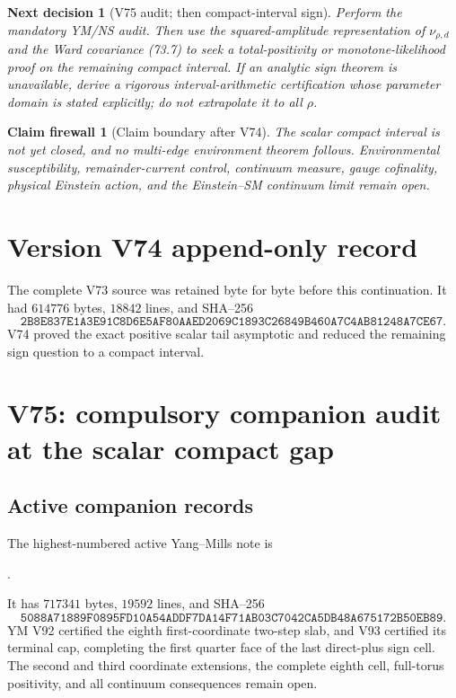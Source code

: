 \documentclass[11pt]{article}
\newtheorem{firewall}[theorem]{Claim firewall}
\newtheorem{decision}[theorem]{Next decision}
\theoremstyle{remark}
\begin{document}
\begin{decision}[V75 audit; then compact-interval sign]
\label{dec:v17v74-next}
Perform the mandatory YM/NS audit.  Then use the squared-amplitude
representation of \(\nu_{\rho,d}\) and the Ward covariance (73.7) to
seek a total-positivity or monotone-likelihood proof on the remaining
compact interval.  If an analytic sign theorem is unavailable, derive
a rigorous interval-arithmetic certification whose parameter domain
is stated explicitly; do not extrapolate it to all \(\rho\).
\end{decision}

\begin{firewall}[Claim boundary after V74]
\label{fire:v17v74}
The scalar compact interval is not yet closed, and no multi-edge
environment theorem follows.  Environmental susceptibility,
remainder-current control, continuum measure, gauge cofinality,
physical Einstein action, and the Einstein--SM continuum limit remain
open.
\end{firewall}

\section*{Version V74 append-only record}
The complete V73 source was retained byte for byte before this
continuation.  It had \(614776\) bytes, \(18842\) lines, and SHA--256
\[
 \texttt{2B8E837E1A3E91C8D6E5AF80AAED2069C1893C26849B460A7C4AB81248A7CE67}.
\]
V74 proved the exact positive scalar tail asymptotic and reduced the
remaining sign question to a compact interval.


\section{V75: compulsory companion audit at the scalar compact gap}
\label{sec:v17v75}

\subsection{Active companion records}

The highest-numbered active Yang--Mills note is
\begin{center}\small
{}.
\end{center}
It has \(717341\) bytes, \(19592\) lines, and SHA--256
\[
 \texttt{5088A71889F0895FD10A54ADDF7DA14F71AB03C7042CA5DB48A675172B50EB89}.
                                                               \tag{75.1}
\]
YM V92 certified the eighth first-coordinate two-step slab, and V93
certified its terminal cap, completing the first quarter face of the
last direct-plus sign cell.  The second and third coordinate
extensions, the complete eighth cell, full-torus positivity, and all
continuum consequences remain open.
\end{document}
